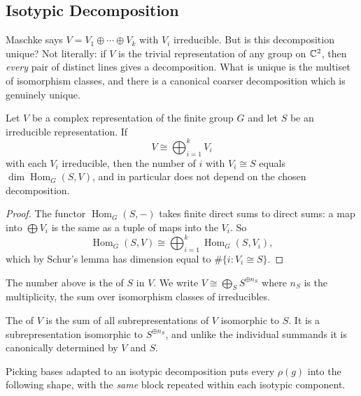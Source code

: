 \documentclass[a4paper]{scrartcl}
\newcommand{\Hom}{\operatorname{Hom}}
\begin{document}
\subsection{Isotypic Decomposition}

Maschke says $V = V_1 \oplus \cdots \oplus V_k$ with $V_i$ irreducible. But is this decomposition unique? Not literally: if $V$ is the trivial representation of any group on $\mathbb{C}^2$, then \emph{every} pair of distinct lines gives a decomposition. What is unique is the multiset of isomorphism classes, and there is a canonical coarser decomposition which is genuinely unique.

\begin{proposition}
	Let $V$ be a complex representation of the finite group $G$ and let $S$ be an irreducible representation. If
	$$V \cong \bigoplus_{i=1}^k V_i$$
	with each $V_i$ irreducible, then the number of $i$ with $V_i \cong S$ equals $\dim \Hom_G(S, V)$, and in particular does not depend on the chosen decomposition.
\end{proposition}
\begin{proof}
	The functor $\Hom_G(S, -)$ takes finite direct sums to direct sums: a map into $\bigoplus V_i$ is the same as a tuple of maps into the $V_i$. So
	$$\Hom_G(S,V) \cong \bigoplus_{i=1}^k \Hom_G(S,V_i),$$
	which by Schur's lemma has dimension equal to $\#\{i : V_i \cong S\}$.
\end{proof}

\begin{definition}[Multiplicity]
	The number above is the  of $S$ in $V$. We write $V \cong \bigoplus_S S^{\oplus n_S}$ where $n_S$ is the multiplicity, the sum over isomorphism classes of irreducibles.
\end{definition}

\begin{definition}
	The  of $V$ is the sum of all subrepresentations of $V$ isomorphic to $S$. It is a subrepresentation isomorphic to $S^{\oplus n_S}$, and unlike the individual summands it is canonically determined by $V$ and $S$.
\end{definition}

Picking bases adapted to an isotypic decomposition puts every $\rho(g)$ into the following shape, with the \emph{same} block repeated within each isotypic component.
\end{document}
